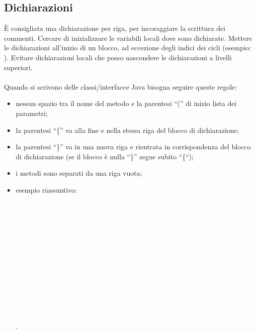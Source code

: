 \subsection{Dichiarazioni}
\`E consigliata una dichiarazione per riga, per incoraggiare la scrittura dei
commenti. Cercare di inizializzare le variabili locali dove sono dichiarate.
Mettere le dichiarazioni all'inizio di un blocco, ad eccezione degli indici dei
cicli (esempio: ). Evitare
dichiarazioni locali che posso nascondere le dichiarazioni a livelli
superiori.\\ \\ Quando si scrivono delle classi/interfacce Java bisogna seguire
queste regole:
\begin{itemize}
  \item nessun spazio tra il nome del metodo e la parentesi ``('' di inizio
  lista dei parametri;
  \item la parentesi ``\{'' va alla fine e nella stessa riga del blocco di
  dichiarazione;
  \item la parentesi ``\}'' va in una nuova riga e rientrata in
  corrispondenza del blocco di dichiarazione (se il blocco \`e nulla ``\}''
  segue subito ``\{``);
  \item i metodi sono separati da una riga vuota;
  \item esempio riassuntivo:\\
    \hspace*{0.5cm} \\
    \hspace*{1.5cm} \\
    \hspace*{1.5cm} \\
    \\
    \hspace*{1.5cm} \\
    \hspace*{2.5cm} \\
    \hspace*{2.5cm} \\
    \hspace*{1.5cm}\co{    \}} \\
    \\
    \hspace*{1.5cm} \\
    \\
    \hspace*{1.5cm} \\
    \hspace*{0.5cm}\co{\}} 
    \\.
\end{itemize}

